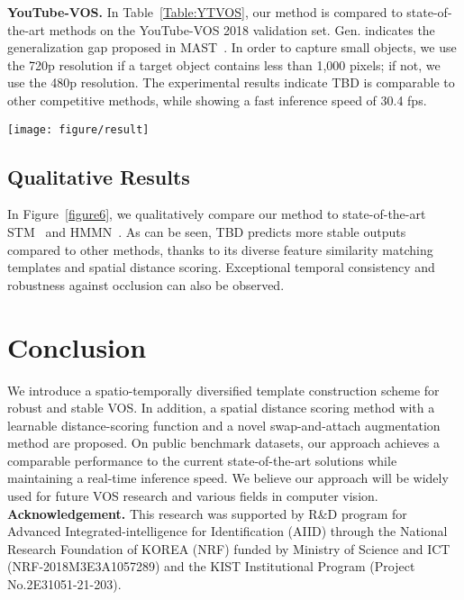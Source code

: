 \documentclass[runningheads]{llncs}
\begin{document}
\noindent\textbf{YouTube-VOS.} In Table~\ref{Table:YTVOS}, our method is compared to state-of-the-art methods on the YouTube-VOS 2018 validation set. Gen. indicates the generalization gap proposed in MAST~\cite{MAST}. In order to capture small objects, we use the 720p resolution if a target object contains less than 1,000 pixels; if not, we use the 480p resolution. The experimental results indicate TBD is comparable to other competitive methods, while showing a fast inference speed of 30.4 fps. 



\begin{figure*}[t]
	\centering
	\texttt{[image: figure/result]}
	\caption{Qualitative evaluation of TBD obtained by comparing it to other state-of-the-art methods.}
	\label{figure6}
\end{figure*}


\subsection{Qualitative Results}
\label{qualitative}
In Figure~\ref{figure6}, we qualitatively compare our method to state-of-the-art STM~\cite{STM} and HMMN~\cite{HMMN}. As can be seen, TBD predicts more stable outputs compared to other methods, thanks to its diverse feature similarity matching templates and spatial distance scoring. Exceptional temporal consistency and robustness against occlusion can also be observed.


\section{Conclusion}
We introduce a spatio-temporally diversified template construction scheme for robust and stable VOS. In addition, a spatial distance scoring method with a learnable distance-scoring function and a novel swap-and-attach augmentation method are proposed. On public benchmark datasets, our approach achieves a comparable performance to the current state-of-the-art solutions while maintaining a real-time inference speed. We believe our approach will be widely used for future VOS research and various fields in computer vision.\\


\noindent\textbf{Acknowledgement.} This research was supported by R\&D program for Advanced Integrated-intelligence for Identification (AIID) through the National Research Foundation of KOREA (NRF) funded by Ministry of Science and ICT (NRF-2018M3E3A1057289) and the KIST Institutional Program (Project No.2E31051-21-203).



\clearpage


\end{document}
